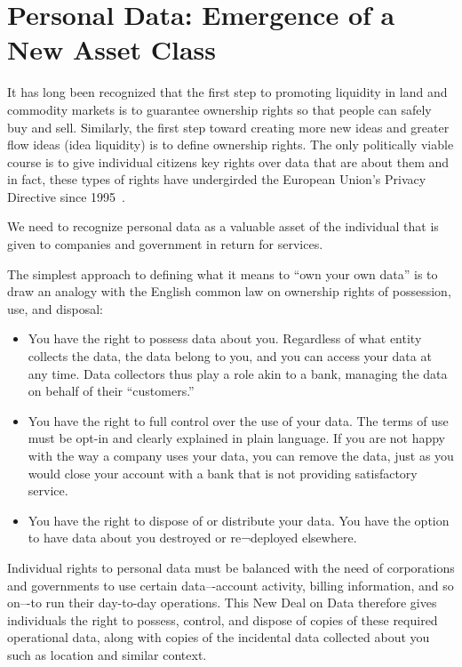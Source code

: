 \section{Personal Data: Emergence of a New Asset Class }

It has long been recognized that the first step to promoting liquidity in land and commodity markets is to guarantee ownership rights so that people can safely buy and sell.
Similarly, the first step toward creating more new ideas and greater flow ideas (idea liquidity) is to define ownership rights.
The only politically viable course is to give individual citizens key rights over data that are about them and in fact, these types of rights have undergirded the European Union's Privacy Directive since 1995~\cite{directive199595}.

We need to recognize personal data as a valuable asset of the individual that is given to companies and government in return for services.

The simplest approach to defining what it means to “own your own data” is to draw an analogy with the English common law on ownership rights of possession, use, and disposal:

\begin{itemize}
\item You have the right to possess data about you. Regardless of what entity collects the data, the data belong to you, and you can access your data at any time. Data collectors thus play a role akin to a bank, managing the data on behalf of their “customers.”

\item You have the right to full control over the use of your data. The terms of use must be opt-in and clearly explained in plain language. If you are not happy with the way a company uses your data, you can remove the data, just as you would close your account with a bank that is not providing satisfactory service.

\item You have the right to dispose of or distribute your data. You have the option to have data about you destroyed or re¬deployed elsewhere.

\end{itemize}

Individual rights to personal data must be balanced with the need of corporations and governments to use certain data–-account activity, billing information, and so on–-to run their day-to-day operations.
This New Deal on Data therefore gives individuals the right to possess, control, and dispose of copies of these required operational data, along with copies of the incidental data collected about you such as location and similar context.

